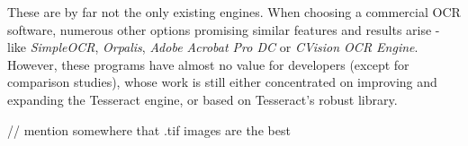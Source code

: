 These are by far not the only existing engines. When choosing a commercial OCR software, numerous other options promising similar features and results arise - like \emph{SimpleOCR}, \emph{Orpalis}, \emph{Adobe Acrobat Pro DC} or \emph{CVision OCR Engine}. However, these programs have almost no value for developers (except for comparison studies), whose work is still either concentrated on improving and expanding the Tesseract engine, or based on Tesseract's robust library.

// mention somewhere that .tif images are the best